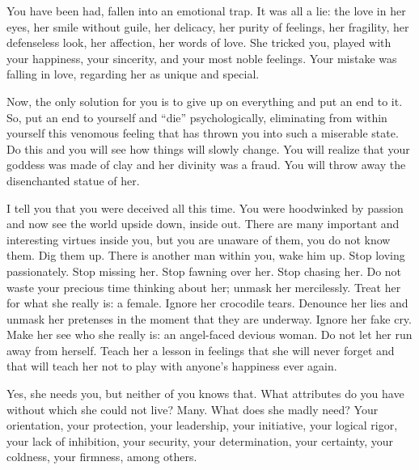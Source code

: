 \par You have been had, fallen into an emotional trap. It was all a lie: the love in her eyes, her smile without guile, her delicacy, her purity of feelings, her fragility, her defenseless look, her affection, her words of love. She tricked you, played with your happiness, your sincerity, and your most noble feelings. Your mistake was falling in love, regarding her as unique and special.

\par Now, the only solution for you is to give up on everything and put an end to it. So, put an end to yourself and \enquote{die} psychologically, eliminating from within yourself this venomous feeling that has thrown you into such a miserable state. Do this and you will see how things will slowly change. You will realize that your goddess was made of clay and her divinity was a fraud. You will throw away the disenchanted statue of her.

\par I tell you that you were deceived all this time. You were hoodwinked by passion and now see the world upside down, inside out. There are many important and interesting virtues inside you, but you are unaware of them, you do not know them. Dig them up. There is another man within you, wake him up. Stop loving passionately. Stop missing her. Stop fawning over her. Stop chasing her. Do not waste your precious time thinking about her; unmask her mercilessly. Treat her for what she really is: a female. Ignore her crocodile tears. Denounce her lies and unmask her pretenses in the moment that they are underway. Ignore her fake cry. Make her see who she really is: an angel-faced devious woman. Do not let her run away from herself. Teach her a lesson in feelings that she will never forget and that will teach her not to play with anyone's happiness ever again.

\par Yes, she needs you, but neither of you knows that. What attributes do you have without which she could not live? Many. What does she madly need? Your orientation, your protection, your leadership, your initiative, your logical rigor, your lack of inhibition, your security, your determination, your certainty, your coldness, your firmness, among others.

